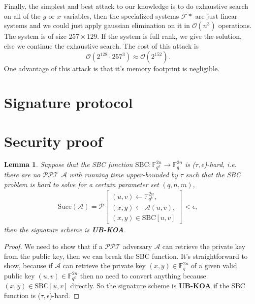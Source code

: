 \documentclass[english]{article}
\newtheorem{lemma}{Lemma}[section]
\begin{document}
		Finally, the simplest and best attack to our knowledge is to do exhaustive search on all of the $y$ or $x$ variables, then the specialized systems $\mathcal{F}*$ are just linear systems and we could just apply gaussian elimination on it in $\mathcal{O}(n^3)$ operations. The system is of size $257 \times 129$. If the system is full rank, we give the solution, else we continue the exhaustive search. The cost of this attack is 
		$$
		\mathcal{O}(2^{128} \cdot 257^{3}) \approx \mathcal{O}(2^{152}).
		$$
		One advantage of this attack is that it's memory footprint is negligible.
\printbibliography

\appendix
\section{Signature protocol}


\section{Security proof}\label{appendix:proof}
	\begin{lemma}
		Suppose that the SBC function $\text{SBC}: \mathbb{F}_{q^k}^{2n} \rightarrow \mathbb{F}_{q}^{2n}$ is ($\tau, \epsilon$)-hard, i.e. there are no $\mathcal{PPT}$ $\mathcal{A}$ with running time upper-bounded by $\tau$ such that the SBC problem is hard to solve for a certain parameter set $(q, n, m)$,
		\begin{align*}
			\text{Succ}(\mathcal{A}) = \mathcal{P}\left[
			\begin{array}{l}
				(u, v) \leftarrow \mathbb{F}_{q^k}^{2n}, \\
				(x, y) \leftarrow \mathcal{A}(u, v), \\
				(x, y) \in \text{SBC}[u, v]
			\end{array}
			\right] < \epsilon,
		\end{align*}
		then the signature scheme is \textbf{UB-KOA}.
	\end{lemma}
	\begin{proof}
		We need to show that if a $\mathcal{PPT}$ adversary $\mathcal{A}$ can retrieve the private key from the public key, then we can break the SBC function.
		It's straightforward to show, because if $\mathcal{A}$ can retrieve the private key $(x, y) \in \mathbb{F}_{q}^{2n}$ of a given valid public key $(u, v) \in \mathbb{F}_{q^k}^{2n}$ then no need to convert anything because $(x, y) \in \text{SBC}[u, v]$ directly. So the signature scheme is \textbf{UB-KOA} if the SBC function is ($\tau, \epsilon$)-hard.
	\end{proof}
	
\end{document}

